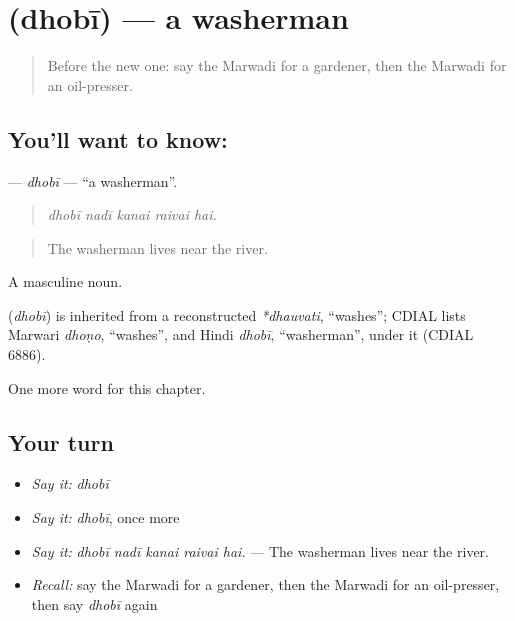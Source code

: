 \section[\texorpdfstring{\mw{धोबी} (dhobī)}{धोबी (dhobī)}]{ (dhobī) — a washerman}

\label{lesson:MW-C263-dhobi}



\begin{quote}
Before the new one: say the Marwadi for a gardener, then the Marwadi for an oil-presser.
\end{quote}

\subsection*{You'll want to know: }
\textbf{} — \emph{dhobī} — \textquotedblleft{}a washerman\textquotedblright{}.

\begin{quote}
    
\end{quote}

\begin{quote}
\emph{dhobī nadī kanai raivai hai.}
\end{quote}

\begin{quote}
The washerman lives near the river.
\end{quote}

A masculine noun.

\begin{cousinweb}
\textbf{} (\emph{dhobī}) is inherited from a reconstructed \emph{*dhauvati}, \textquotedblleft{}washes\textquotedblright{}; CDIAL lists Marwari \emph{dhoṇo}, \textquotedblleft{}washes\textquotedblright{}, and Hindi \emph{dhobī}, \textquotedblleft{}washerman\textquotedblright{}, under it (CDIAL 6886).
\end{cousinweb}

\begin{grammarlens}[title={What you've built}]
One more word for this chapter.
\end{grammarlens}

\subsection*{Your turn}
\begin{itemize}
\raggedright
  \item \emph{Say it:} \emph{dhobī}
  \item \emph{Say it:} \emph{dhobī}, once more
  \item \emph{Say it:} \emph{dhobī nadī kanai raivai hai.} — The washerman lives near the river.
  \item \emph{Recall:} say the Marwadi for a gardener, then the Marwadi for an oil-presser, then say \emph{dhobī} again
\end{itemize}

